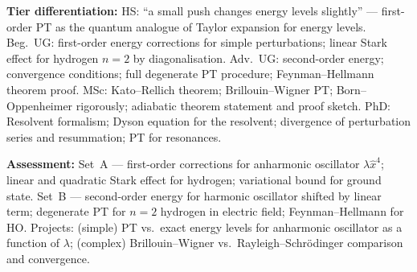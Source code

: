 \documentclass[11pt,a4paper]{article}
\begin{document}
\begin{tcolorbox}[modulebox, title={Module~I.3 --- Lecture L09: Perturbation Theory}]
\medskip\textbf{Tier differentiation:}
HS: ``a small push changes energy levels slightly'' --- first-order PT as the
quantum analogue of Taylor expansion for energy levels.
Beg.\ UG: first-order energy corrections for simple perturbations;
linear Stark effect for hydrogen $n=2$ by diagonalisation.
Adv.\ UG: second-order energy; convergence conditions; full degenerate PT
procedure; Feynman--Hellmann theorem proof.
MSc: Kato--Rellich theorem; Brillouin--Wigner PT; Born--Oppenheimer rigorously;
adiabatic theorem statement and proof sketch.
PhD: Resolvent formalism; Dyson equation for the resolvent;
divergence of perturbation series and resummation; PT for resonances.

\medskip\textbf{Assessment:}
Set~A --- first-order corrections for anharmonic oscillator $\lambda\hat{x}^4$;
linear and quadratic Stark effect for hydrogen; variational bound for ground state.
Set~B --- second-order energy for harmonic oscillator shifted by linear term;
degenerate PT for $n=2$ hydrogen in electric field; Feynman--Hellmann for HO.
Projects: (simple) PT vs.\ exact energy levels for anharmonic oscillator as a function
of $\lambda$; (complex) Brillouin--Wigner vs.\ Rayleigh--Schr\"odinger comparison and
convergence.
\end{tcolorbox}
\end{document}
